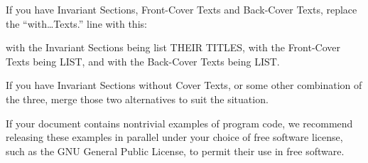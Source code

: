 If you have Invariant Sections, Front-Cover Texts and
Back-Cover Texts, replace the “with…Texts.” line
with this:


\begin{myindentpara}{2cm}
with the Invariant Sections being list THEIR TITLES, with
the Front-Cover Texts being LIST, and with the Back-Cover Texts
being LIST.
\end{myindentpara}

If you have Invariant Sections without Cover Texts, or some
other combination of the three, merge those two alternatives
to suit the situation.

If your document contains nontrivial examples of program code,
we recommend releasing these examples in parallel under your
choice of free software license, such as the GNU General
Public License, to permit their use in free software.

